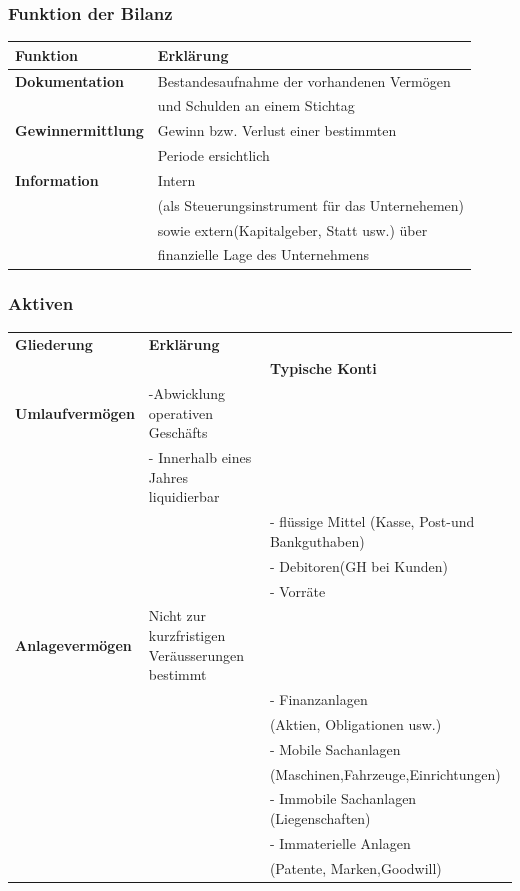 \documentclass[../ZF_Wing.tex]{subfiles}
\begin{document}
\subsubsection{Funktion der Bilanz}

\begin{table} [H]
\begin{tabular}{l|l}
\colorbox{orange!30} {\textbf{Funktion}} & \colorbox{orange!30} {\textbf{Erklärung}}\\
\hline
\textbf{Dokumentation} & Bestandesaufnahme der vorhandenen Vermögen  \\
& und Schulden an einem Stichtag\\
\hline
\textbf{Gewinnermittlung} & Gewinn bzw. Verlust einer bestimmten \\
& Periode ersichtlich\\
\hline
\textbf{Information} & Intern \\
&(als Steuerungsinstrument für das Unternehemen)\\
& sowie extern(Kapitalgeber, Statt usw.) über\\ &finanzielle Lage des Unternehmens\\
\end{tabular}

\end{table}

\subsubsection{Aktiven}
\begin{table} [H]
\begin{tabular}{l|l|l}
\colorbox{orange!30} {\textbf{Gliederung}} & \colorbox{orange!30} {\textbf{Erklärung}}\\& & \colorbox{orange!30} {\textbf{Typische Konti}}\\
\hline
\textbf{Umlaufvermögen} & -Abwicklung operativen Geschäfts \\
& - Innerhalb eines Jahres liquidierbar \\
&& - flüssige Mittel (Kasse, Post-und Bankguthaben)\\
&& - Debitoren(GH bei Kunden)\\
&& - Vorräte \\
\hline
\textbf{Anlagevermögen} & Nicht zur kurzfristigen Veräusserungen bestimmt \\
&& - Finanzanlagen\\
&&(Aktien, Obligationen usw.)\\
&& - Mobile Sachanlagen\\&& (Maschinen,Fahrzeuge,Einrichtungen)\\
&& - Immobile Sachanlagen (Liegenschaften)\\
&& - Immaterielle Anlagen\\
&&(Patente, Marken,Goodwill)\\
\hline
\end{tabular}

\end{table}
\end{document}
